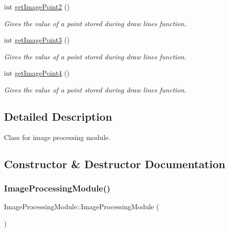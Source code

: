 \begin{DoxyCompactItemize}
int \mbox{\hyperlink{class_image_processing_module_a48bf5bb52b56dfe216e8e45a6877fcd8}{get\+Image\+Point2}} ()
\begin{DoxyCompactList}\small\item\em Gives the value of a point stored during draw lines function. \end{DoxyCompactList}\item 
int \mbox{\hyperlink{class_image_processing_module_a7e09eceafa1f1955da80f2a73e0cae3d}{get\+Image\+Point3}} ()
\begin{DoxyCompactList}\small\item\em Gives the value of a point stored during draw lines function. \end{DoxyCompactList}\item 
int \mbox{\hyperlink{class_image_processing_module_ab9438399cb05c450d3cab12a9a513d45}{get\+Image\+Point4}} ()
\begin{DoxyCompactList}\small\item\em Gives the value of a point stored during draw lines function. \end{DoxyCompactList}\end{DoxyCompactItemize}


\subsection{Detailed Description}
Class for image processing module. 

\subsection{Constructor \& Destructor Documentation}
\mbox{\label{class_image_processing_module_a2c35e6db14ed55d6fc612076aaf1324b}} 
\subsubsection{\texorpdfstring{Image\+Processing\+Module()}{ImageProcessingModule()}}
{\footnotesize\ttfamily Image\+Processing\+Module\+::\+Image\+Processing\+Module (\begin{DoxyParamCaption}{ }\end{DoxyParamCaption})}




